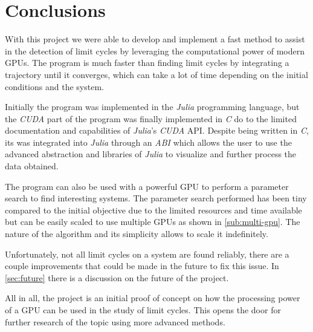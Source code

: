 
\section{Conclusions}%
\label{sec:conclusions}

With this project we were able to develop and implement a fast method to assist
in the detection of limit cycles by leveraging the computational power of modern
GPUs.  The program is much faster than finding limit cycles by integrating a
trajectory until it converges, which can take a lot of time depending on the
initial conditions and the system.

Initially the program was implemented in the \emph{Julia} programming language,
but the \emph{CUDA} part of the program was finally implemented in \emph{C} do
to the limited documentation and capabilities of \emph{Julia}'s \emph{CUDA} API.
Despite being written in \emph{C}, its was integrated into \emph{Julia} through
an \emph{ABI} which allows the user to use the advanced abstraction and libraries
of \emph{Julia} to visualize and further process the data obtained.

The program can also be used with a powerful GPU to perform a parameter search
to find interesting systems. The parameter search performed has been tiny
compared to the initial objective due to the limited resources and time
available but can be easily scaled to use multiple GPUs as shown in
\cref{sub:multi-gpu}. The nature of the algorithm and its simplicity allows
to scale it indefinitely.

Unfortunately, not all limit cycles on a system are found
reliably, there are a couple improvements that could be made in the future to
fix this issue. In \cref{sec:future} there is a discussion on the future of the
project.

All in all, the project is an initial proof of concept on how the processing power
of a GPU can be used in the study of limit cycles. This opens the door for further research
of the topic using more advanced methods.
